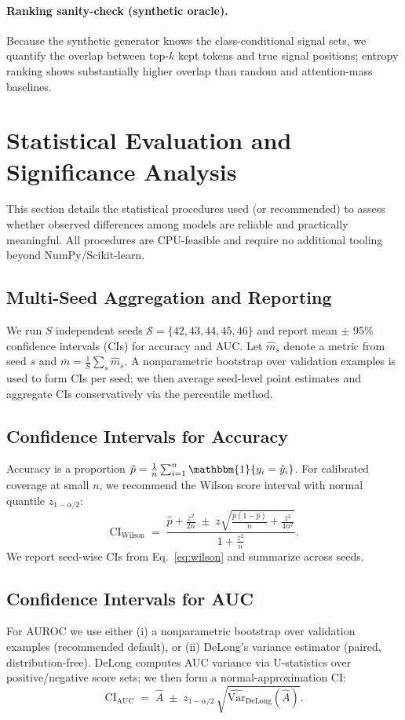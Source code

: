 \documentclass{article}
\begin{document}
\paragraph{Ranking sanity-check (synthetic oracle).}
Because the synthetic generator knows the class-conditional signal sets, we quantify the overlap between top-$k$ kept tokens and true signal positions; entropy ranking shows substantially higher overlap than random and attention-mass baselines.
\section{Statistical Evaluation and Significance Analysis}
\label{sec:stats}
This section details the statistical procedures used (or recommended) to assess whether observed differences among models are reliable and practically meaningful. All procedures are CPU-feasible and require no additional tooling beyond NumPy/Scikit-learn.

\subsection{Multi-Seed Aggregation and Reporting}
We run $S$ independent seeds $\mathcal{S}=\{42,43,44,45,46\}$ and report mean $\pm$ 95\% confidence intervals (CIs) for accuracy and AUC. Let $\widehat{m}_s$ denote a metric from seed $s$ and $\bar{m}=\tfrac{1}{S}\sum_s \widehat{m}_s$. A nonparametric bootstrap over validation examples is used to form CIs per seed; we then average seed-level point estimates and aggregate CIs conservatively via the percentile method.

\subsection{Confidence Intervals for Accuracy}
Accuracy is a proportion $\hat{p}=\frac{1}{n}\sum_{i=1}^{n}\mathbbm{1}\{y_i=\hat{y}_i\}$. For calibrated coverage at small $n$, we recommend the Wilson score interval with normal quantile $z_{1-\alpha/2}$:
\begin{equation}
\label{eq:wilson}
\text{CI}_{\text{Wilson}} \;=\;
\frac{\hat{p} + \frac{z^2}{2n} \;\pm\; z \sqrt{\frac{\hat{p}(1-\hat{p})}{n} + \frac{z^2}{4n^2}}}{1 + \frac{z^2}{n}}.
\end{equation}
We report seed-wise CIs from Eq.~\eqref{eq:wilson} and summarize across seeds.

\subsection{Confidence Intervals for AUC}
For AUROC we use either (i) a nonparametric bootstrap over validation examples (recommended default), or (ii) DeLong’s variance estimator (paired, distribution-free). DeLong computes AUC variance via U-statistics over positive/negative score sets; we then form a normal-approximation CI:
\begin{equation}
\label{eq:delong}
\text{CI}_{\text{AUC}} \;=\; \hat{A} \;\pm\; z_{1-\alpha/2}\,\sqrt{\widehat{\mathrm{Var}}_{\text{DeLong}}(\hat{A})}.
\end{equation}
\end{document}
